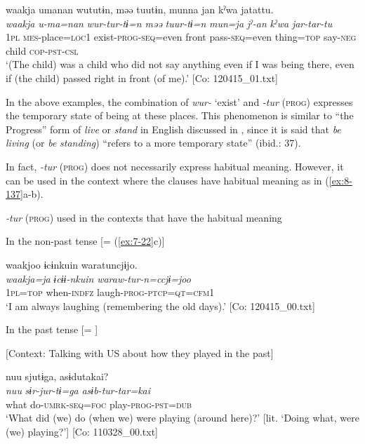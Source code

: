 \ex
{\TM}
\glll  waakja  umanan  wututɨn,  məə   tuutɨn,  munna  jan  kˀwa  jatattu.\\
\textit{waakja}  \textit{u-ma=nan}  \textit{wur-tur-tɨ=n  məə}      \textit{tuur-tɨ=n}  \textit{mun=ja}  \textit{jˀ-an}  \textit{kˀwa}  \textit{jar-tar-tu}\\
1\textsc{pl}  \textsc{mes}-place=\textsc{loc1}  exist-\textsc{prog}-\textsc{seq}=even  front  pass-\textsc{seq}=even  thing=\textsc{top}  say-\textsc{neg}  child  \textsc{cop}-\textsc{pst}-\textsc{csl}\\
\glt ‘(The child) was a child who did not say anything even if I was being there, even if (the child) passed right in front (of me).’ [Co: 120415\_01.txt]
\z
\z

In the above examples, the combination of \textit{wur-} ‘exist’ and \textit{-tur} (\textsc{prog}) expresses the temporary state of being at these places. This phenomenon is similar to “the Progress” form of \textit{live} or \textit{stand} in English discussed in \citet{Comrie1976}, since it is said that \textit{be} \textit{living} (or \textit{be} \textit{standing}) “refers to a more temporary state” (ibid.: 37).

  In fact, \textit{-tur} (\textsc{prog}) does not necessarily express habitual meaning. However, it can be used in the context where the clauses have habitual meaning as in (\ref{ex:8-137}a-b).

\ea\label{ex:8-137}
  \textit{-tur} (\textsc{prog}) used in the contexts that have the habitual meaning

\ea In the non-past tense [= (\ref{ex:7-22}c)]

{\TM}
\glll  waakjoo  ɨcɨnkuin  waratuncjɨjo.\\
\textit{waakja=ja}  \textit{ɨcɨɨ-nkuin}  \textit{waraw-tur-n=ccjɨ=joo}\\
1\textsc{pl}=\textsc{top}  when-\textsc{indfz}  laugh-\textsc{prog}-\textsc{ptcp}=\textsc{qt}=\textsc{cfm1}\\
\glt ‘I am always laughing (remembering the old days).’ [Co: 120415\_00.txt]

\ex In the past tense [= ]

    [Context: Talking with US about how they played in the past]

{\TM}
\glll  nuu  sjutɨga,  asɨdutakai?\\
\textit{nuu}  \textit{sɨr-jur-tɨ=ga}  \textit{asɨb-tur-tar=kai}\\
what  do-\textsc{umrk}-\textsc{seq}=\textsc{foc}  play-\textsc{prog}-\textsc{pst}=\textsc{dub}\\
\glt ‘What did (we) do (when we) were playing (around here)?’ [lit. ‘Doing what, were (we) playing?’]       [Co: 110328\_00.txt]
\z
\z

